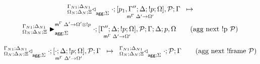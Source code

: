 
\begin{multline}
\transx{
   \contstatea{\Delta_N}{\cdot ; \pframe{p_1, \Gamma''}{\Delta}{\bang
   p}{\Omega}{\Delta'}{\Omega'}, \lstack{P}}{\Gamma}{\Sigma}
}
{
   \matstatea{\Delta_N}{\cdot; \pframe{\Gamma''}{\Delta}{\bang p}
      {\Omega}{\Delta'}{\Omega'}, \lstack{P}}{\Gamma}{\Delta}{p,
      \Omega}{\Delta' \rightarrow \Omega' \otimes \bang p}{\Sigma}
} \tag{agg next \bang p $\lstack{P}$}
\end{multline}

\[
\trans{
   \contstatea{\Delta_N}{\cdot; \pframe{\cdot}{\Delta}{\bang
   p}{\Omega}{\Delta'}{\Omega'}, \lstack{P}}{\Gamma}{\Sigma}
}
{
   \contstatea{\Delta_N}{\cdot ; \lstack{P}}{\Gamma}{\Sigma}
} \tag{agg next \bang frame $\lstack{P}$}
\]
